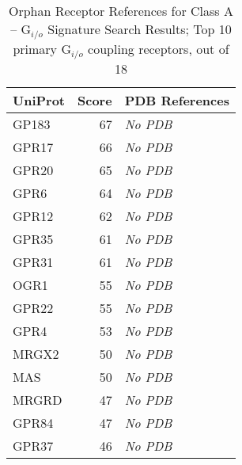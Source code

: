 \begin{table}[!h]

\caption{\label{tab:a-gio-references}Orphan Receptor References for Class A – G$_{i/o}$ Signature Search Results; Top 10 primary G$_{i/o}$ coupling receptors, out of 18}
\centering
\begin{tabular}{lrl}
\toprule
UniProt & Score & PDB References\\
\midrule
GP183 & 67 & \textit{No PDB}\\
GPR17 & 66 & \textit{No PDB}\\
GPR20 & 65 & \textit{No PDB}\\
GPR6 & 64 & \textit{No PDB}\\
GPR12 & 62 & \textit{No PDB}\\
GPR35 & 61 & \textit{No PDB}\\
GPR31 & 61 & \textit{No PDB}\\
OGR1 & 55 & \textit{No PDB}\\
GPR22 & 55 & \textit{No PDB}\\
GPR4 & 53 & \textit{No PDB}\\
MRGX2 & 50 & \textit{No PDB}\\
MAS & 50 & \textit{No PDB}\\
MRGRD & 47 & \textit{No PDB}\\
GPR84 & 47 & \textit{No PDB}\\
GPR37 & 46 & \textit{No PDB}\\
\bottomrule
\end{tabular}
\end{table}
